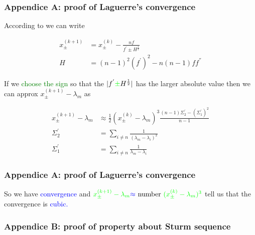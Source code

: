 \documentclass{beamer}
\theoremstyle{definition} \newtheorem{de}{Def}
\theoremstyle{remark} \newtheorem{os}[de]{Remark}
\theoremstyle{plain} \newtheorem{te}[de]{Teo}
\theoremstyle{plain} \newtheorem{co}[de]{Cor}
\theoremstyle{plain} \newtheorem{pr}[de]{Prop}
\theoremstyle{plain} \newtheorem{lem}[de]{Lemm}
\theoremstyle{remark} \newtheorem{rem}[de]{Remark}
\begin{document}
\begin{frame}[label=LagProof]
  \frametitle{Appendice A: proof of Laguerre's convergence}

  According to \cite[p.444]{bookWilkinson} we can write 

  \begin{align*}
    x_{\pm}^{(k+1)} &= x_{\pm}^{(k)} - \frac{n f}{f^{'} \pm H^{\frac{1}{2}}} \\
    H &= (n-1)^2 (f^{'})^2 -n(n-1)f f^{''}
  \end{align*}

  If we \textcolor{green}{choose the sign} so that the $| f^{'} \textcolor{green}{\pm} H^{\frac{1}{2}} |$ has the larger absolute value then we can approx $x_{\pm}^{(k+1)} - \lambda_m$ as

  \begin{align*}
    x_{\pm}^{(k+1)} - \lambda_m &\approx \frac{1}{2}(x_{\pm}^{(k)} - \lambda_m)^3 \frac{(n-1)\Sigma_2^{'} - (\Sigma_1^{'})^2}{n-1}\\
    \Sigma_2^{'} &= \sum_{i\ne n} \frac{1}{(\lambda_m - \lambda_i)^2}\\
    \Sigma_1^{'} &= \sum_{i\ne n} \frac{1}{\lambda_m - \lambda_i}
  \end{align*}

\end{frame}

\begin{frame}
  \frametitle{Appendice A: proof of Laguerre's convergence}

  So we have \textcolor{blue}{convergence} and $\textcolor{green}{x_{\pm}^{(k+1)} - \lambda_m} \textcolor{blue}{\approx} \text{ number } \textcolor{green}{(x_{\pm}^{(k)} - \lambda_m)^3}$ tell us that the convergence is \textcolor{blue}{cubic.}

  \hyperlink{BeforeLagProof}{}
\end{frame}

\begin{frame}[label=SturmSequence]
  \frametitle{Appendice B: proof of property about Sturm sequence}

  
  \hyperlink{BeforeSturmSequence}{}

\end{frame}
\end{document}
